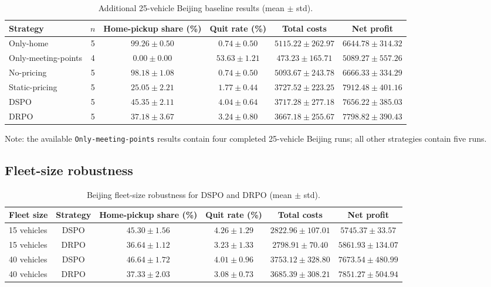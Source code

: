 \documentclass[preprint,12pt,authoryear]{elsarticle}
\begin{document}
\begin{table}[t]
\centering
\caption{Additional 25-vehicle Beijing baseline results (mean $\pm$ std).}
\label{tab:d2}
\small
\begin{threeparttable}
\begin{tabular}{lccccc}
\toprule
Strategy & $n$ & Home-pickup share (\%) & Quit rate (\%) & Total costs & Net profit \\
\midrule
Only-home & 5 & $99.26 \pm 0.50$ & $0.74 \pm 0.50$ & $5115.22 \pm 262.97$ & $6644.78 \pm 314.32$ \\
Only-meeting-points & 4 & $0.00 \pm 0.00$ & $53.63 \pm 1.21$ & $473.23 \pm 165.71$ & $5089.27 \pm 557.26$ \\
No-pricing & 5 & $98.18 \pm 1.08$ & $0.74 \pm 0.50$ & $5093.67 \pm 243.78$ & $6666.33 \pm 334.29$ \\
Static-pricing & 5 & $25.05 \pm 2.21$ & $1.77 \pm 0.44$ & $3727.52 \pm 223.25$ & $7912.48 \pm 401.16$ \\
DSPO & 5 & $45.35 \pm 2.11$ & $4.04 \pm 0.64$ & $3717.28 \pm 277.18$ & $7656.22 \pm 385.03$ \\
DRPO & 5 & $37.18 \pm 3.67$ & $3.24 \pm 0.80$ & $3667.18 \pm 255.67$ & $7798.82 \pm 390.43$ \\
\bottomrule
\end{tabular}
\begin{tablenotes}
\footnotesize
\item Note: the available \texttt{Only-meeting-points} results contain four completed 25-vehicle Beijing runs; all other strategies contain five runs.
\end{tablenotes}
\end{threeparttable}
\end{table}

\subsection{Fleet-size robustness}

\begin{table}[t]
\centering
\caption{Beijing fleet-size robustness for DSPO and DRPO (mean $\pm$ std).}
\label{tab:d3}
\small
\begin{tabular}{lccccc}
\toprule
Fleet size & Strategy & Home-pickup share (\%) & Quit rate (\%) & Total costs & Net profit \\
\midrule
15 vehicles & DSPO & $45.30 \pm 1.56$ & $4.26 \pm 1.29$ & $2822.96 \pm 107.01$ & $5745.37 \pm 33.57$ \\
15 vehicles & DRPO & $36.64 \pm 1.12$ & $3.23 \pm 1.33$ & $2798.91 \pm 70.40$ & $5861.93 \pm 134.07$ \\
40 vehicles & DSPO & $46.64 \pm 1.72$ & $4.01 \pm 0.96$ & $3753.12 \pm 328.80$ & $7673.54 \pm 480.99$ \\
40 vehicles & DRPO & $37.33 \pm 2.03$ & $3.08 \pm 0.73$ & $3685.39 \pm 308.21$ & $7851.27 \pm 504.94$ \\
\bottomrule
\end{tabular}
\end{table}
\end{document}
